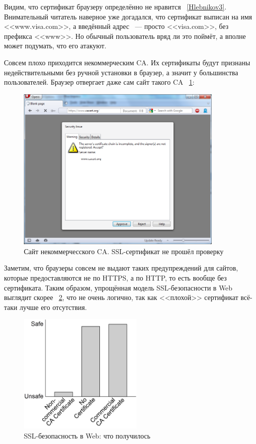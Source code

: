 \documentclass[10pt, a5paper]{article}
\begin{document}
Видим, что сертификат браузеру определённо не нравится ~\ref{Hlebnikov3}. Внимательный
читатель наверное уже догадался, что сертификат выписан на имя
<<www.visa.com>>, а введённый адрес ~--- просто <<visa.com>>, без префикса
<<www>>. Но обычный пользователь вряд ли это поймёт, а вполне может
подумать, что его атакуют.

Совсем плохо приходится некоммерческим CA. Их сертификаты будут
признаны недействительными без ручной установки в браузер, а значит
у большинства пользователей. Браузер отвергает даже сам сайт такого
CA ~\ref{Hlebnikov4}:

\begin{center}
\begin{figure}[h!]
  \centering
  \includegraphics[width=10cm]{Hlebnikov4.png}
  \caption{Сайт некоммерчесского CA. SSL-сертификат не прошёл проверку}
  \label{Hlebnikov4}
\end{figure}
\end{center}
Заметим, что браузеры совсем не выдают таких предупреждений для
сайтов, которые предоставляются не по HTTPS, а по HTTP, то есть
вообще без сертификата. Таким образом, упрощённая модель
SSL-безопасности в Web выглядит скорее ~\ref{Hlebnikov5}, что не очень логично, так как <<плохой>> сертификат всё-таки лучше его
отсутствия.

\begin{center}
\begin{figure}[h!]
  \centering
  \includegraphics[width=6cm]{Hlebnikov5.png}
  \caption{SSL-безопасность в Web: что получилось}
  \label{Hlebnikov5}
\end{figure}
\end{center}
\end{document}
